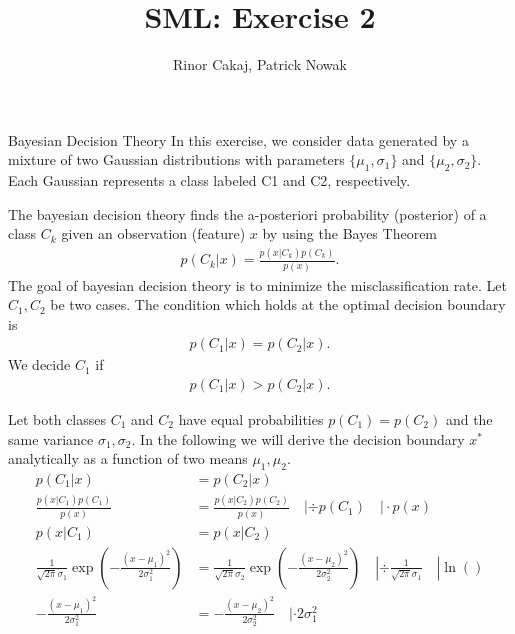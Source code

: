 \documentclass[
ngerman,
]{tudaexercise}
\begin{document}
	
	\title[Uebung]{SML: Exercise 2}
	\author{Rinor Cakaj, Patrick Nowak}
	
	\maketitle

	\begin{task}{Bayesian Decision Theory}
		In this exercise, we consider data generated by a mixture of two Gaussian distributions with parameters $\{\mu_1, \sigma_1\}$ and $\{\mu_2, \sigma_2\}$. Each Gaussian represents a class labeled C1 and C2, respectively.
		\begin{subtask}
			The bayesian decision theory finds the a-posteriori probability (posterior) of a class $C_k$ given an observation (feature) $x$ by using the Bayes Theorem
			\begin{align*}
			p(C_k | x) = \frac{p(x|C_k)p(C_k)}{p(x)}.
			\end{align*}
			The goal of bayesian decision theory is to minimize the misclassification rate. Let $C_1, C_2$ be two cases. The condition which holds at the optimal decision boundary is
			\begin{align*}
			p(C_1 | x ) = p (C_2 | x).
			\end{align*}
			We decide $C_1$ if 
			\begin{align*}
			p(C_1 | x) > p(C_2 | x).
			\end{align*}
		\end{subtask}
		\begin{subtask}
			Let both classes $C_1$ and $C_2$ have equal probabilities $p(C_1) = p(C_2)$ and the same variance $\sigma_1, \sigma_2$. In the following we will derive the decision boundary $x^*$ analytically as a function of two means $\mu_1, \mu_2$.
			\begin{align*}
			p(C_1 | x) &= p(C_2 | x) \\
			\frac{p(x | C_1) p(C_1)}{p(x)} &= \frac{p(x | C_2) p(C_2)}{p(x)} \quad | \div p(C_1) \quad | \cdot p(x) \\
			p(x | C_1) &= p(x |C_2) \\
			\frac{1}{\sqrt{2 \pi} \sigma_1} \exp \left( -\frac{(x- \mu_1)^2}{2 \sigma_1^2} \right) &= \frac{1}{\sqrt{2 \pi} \sigma_2} \exp \left( -\frac{(x- \mu_2)^2}{2 \sigma_2^2} \right) \quad | \div \frac{1}{\sqrt{2 \pi} \sigma_1} \quad | \ln() \\
			-\frac{(x- \mu_1)^2}{2 \sigma_1^2} &= -\frac{(x- \mu_2)^2}{2 \sigma_2^2} \quad | \cdot 2 \sigma_1^2 \\

\end{align*}
\end{subtask}
\end{task}
\end{document}
